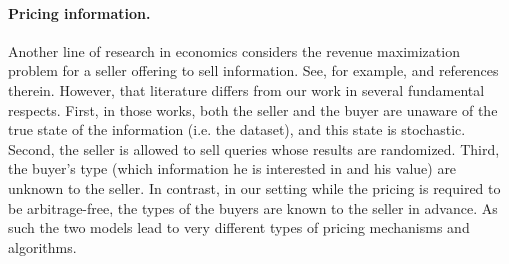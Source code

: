 \paragraph{Pricing information.}
Another line of research in economics considers the revenue maximization problem for a seller offering to sell information. See, for example, \cite{BKP-12, BB-15, BBS-17} and references therein. However, that literature differs from our work in several fundamental respects. First, in those works, both the seller and the buyer are unaware of the true state of the information (i.e. the dataset), and this state is stochastic. Second, the seller is allowed to sell queries whose results are randomized. Third, the buyer's type (which information he is interested in and his value) are unknown to the seller. In contrast, in our setting while the pricing is required to be arbitrage-free, the types of the buyers are known to the seller in advance. As such the two models lead to very different types of pricing mechanisms and algorithms.